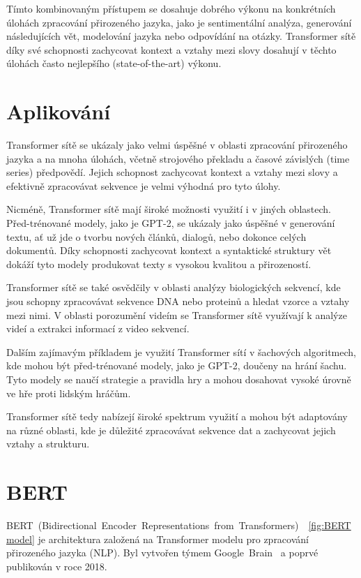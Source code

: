 Tímto kombinovaným přístupem se dosahuje dobrého výkonu na konkrétních úlohách zpracování přirozeného jazyka, jako je sentimentální analýza, generování následujících vět, modelování jazyka nebo odpovídání na otázky.
Transformer sítě díky své schopnosti zachycovat kontext a vztahy mezi slovy dosahují v těchto úlohách často nejlepšího (state-of-the-art) výkonu.

\section{Aplikování}
Transformer sítě se ukázaly jako velmi úspěšné v oblasti zpracování přirozeného jazyka a na mnoha úlohách, včetně strojového překladu a časové závislých (time series) předpovědí.
Jejich schopnost zachycovat kontext a vztahy mezi slovy a efektivně zpracovávat sekvence je velmi výhodná pro tyto úlohy.

Nicméně, Transformer sítě mají široké možnosti využití i v jiných oblastech.
Před-trénované modely, jako je GPT-2, se ukázaly jako úspěšné v generování textu, ať už jde o tvorbu nových článků, dialogů, nebo dokonce celých dokumentů.
Díky schopnosti zachycovat kontext a syntaktické struktury vět dokáží tyto modely produkovat texty s vysokou kvalitou a přirozeností.

Transformer sítě se také osvědčily v oblasti analýzy biologických sekvencí, kde jsou schopny zpracovávat sekvence DNA nebo proteinů a hledat vzorce a vztahy mezi nimi.
V oblasti porozumění videím se Transformer sítě využívají k analýze videí a extrakci informací z video sekvencí.

Dalším zajímavým příkladem je využití Transformer sítí v šachových algoritmech, kde mohou být před-trénované modely, jako je GPT-2, doučeny na hrání šachu.
Tyto modely se naučí strategie a pravidla hry a mohou dosahovat vysoké úrovně ve hře proti lidským hráčům.

Transformer sítě tedy nabízejí široké spektrum využití a mohou být adaptovány na různé oblasti, kde je důležité zpracovávat sekvence dat a zachycovat jejich vztahy a strukturu.

\section{BERT}
BERT~(Bidirectional~Encoder~Representations~from~Transformers)~\cite{link29}~\ref{fig:BERT model} je architektura založená na Transformer modelu pro zpracování přirozeného jazyka (NLP).
Byl vytvořen týmem Google~Brain~\cite{link31} a poprvé publikován v roce 2018.

